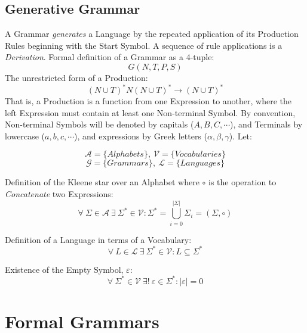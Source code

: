 \documentclass{article}
\begin{document}
\subsection{Generative Grammar}

A Grammar \emph{generates} a Language by the repeated application of
its Production Rules beginning with the Start Symbol. A sequence of
rule applications is a \emph{Derivation}. Formal definition of a
Grammar as a 4-tuple:
\[
    G(N,T,P,S)
\]
The unrestricted form of a Production:
\[
    (N \cup T)^*N(N \cup T)^* \rightarrow (N \cup T)^*
\]
That is, a Production is a function from one Expression to
another, where the left Expression must contain at least one
Non-terminal Symbol. By convention, Non-terminal Symbols
will be denoted by capitals ($A,B,C,\cdots$), and Terminals by
lowercase ($a,b,c,\cdots$), and expressions by Greek letters
($\alpha,\beta,\gamma$). Let:

\[
    \mathcal{A} = \{ Alphabets \},\: \mathcal{V} = \{ Vocabularies \}
\] \[
    \mathcal{G} = \{ Grammars \},\: \mathcal{L} = \{ Languages \}
\]

    \begin{description}

    \item Definition of the Kleene star over an
      Alphabet where $\circ$ is the operation to \emph{Concatenate} two
      Expressions:
    \[
        \forall \: \Sigma \in \mathcal{A} \:
        \exists \: \Sigma^* \in \mathcal{V}
        : \Sigma^* = \bigcup_{i=0}^{|\Sigma|} \Sigma_i
        = (\Sigma,\circ)
    \]

    \item Definition of a Language in terms of a Vocabulary:
    \[
        \forall \: L \in \mathcal{L} \:
        \exists \: \Sigma^* \in \mathcal{V}
        : L \subseteq \Sigma^*
    \]

    \item Existence of the Empty Symbol, $\varepsilon$:
    \[
        \forall \: \Sigma^* \in \mathcal{V} \:
        \exists ! \: \varepsilon \in \Sigma^*
        : |\varepsilon|=0
    \]

    \end{description}



\section{Formal Grammars}
\end{document}
